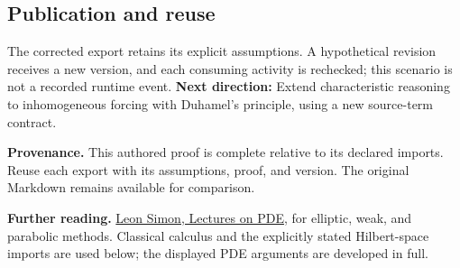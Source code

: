 \documentclass[preprint,12pt,aps,pra,showkeys,amsmath,amssymb,superscriptaddress,floatfix]{revtex4-2}
\theoremstyle{definition}
\theoremstyle{remark}
\begin{document}
\subsection{Publication and reuse}
The corrected export retains its explicit assumptions. A hypothetical
revision receives a new version, and each consuming activity is
rechecked; this scenario is not a recorded runtime event. \textbf{Next
direction:} Extend characteristic reasoning to inhomogeneous forcing
with Duhamel's principle, using a new source-term contract.

\par\medskip\begingroup\small\linespread{1.0}\selectfont\noindent\textbf{Provenance.} This authored proof is complete relative to its declared imports. Reuse
each export with its assumptions, proof, and version. The original
Markdown remains available for comparison.
\par\endgroup

\par\smallskip\begingroup\small\linespread{1.0}\selectfont\noindent\textbf{Further reading.} \href{https://math.stanford.edu/~lms/lecs-on-pde.pdf}{Leon Simon,
Lectures on PDE}, for elliptic, weak, and parabolic methods. Classical
calculus and the explicitly stated Hilbert-space imports are used below;
the displayed PDE arguments are developed in full.\par\endgroup
\end{document}
